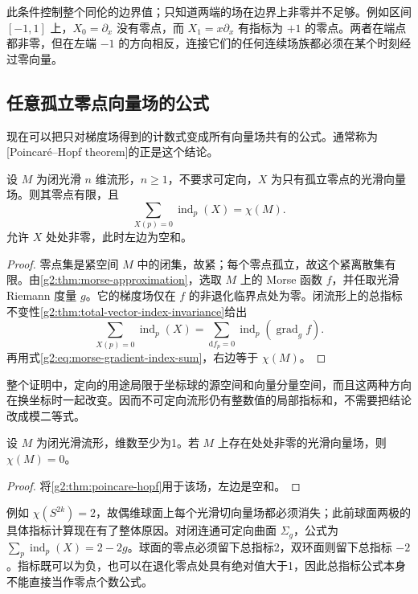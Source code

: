 此条件控制整个同伦的边界值；只知道两端的场在边界上非零并不足够。例如区间 \([-1,1]\) 上，\(X_0=\partial_x\) 没有零点，而 \(X_1=x\partial_x\) 有指标为 \(+1\) 的零点。两者在端点都非零，但在左端 \(-1\) 的方向相反，连接它们的任何连续场族都必须在某个时刻经过零向量。

\subsection{任意孤立零点向量场的公式}
\label{g2:subsec:1704:03}

现在可以把只对梯度场得到的计数式变成所有向量场共有的公式。通常称为[Poincaré--Hopf theorem]的正是这个结论。

\begin{theorem}\label{g2:thm:poincare-hopf}
	设 \(M\) 为闭光滑 \(n\) 维流形，\(n\ge1\)，不要求可定向，\(X\) 为只有孤立零点的光滑向量场。则其零点有限，且
	\begin{equation}\label{g2:eq:poincare-hopf}
		\sum_{X(p)=0}\operatorname{ind}_p(X)=\chi(M).
	\end{equation}
	允许 \(X\) 处处非零，此时左边为空和。
\end{theorem}
\begin{proof}
	零点集是紧空间 \(M\) 中的闭集，故紧；每个零点孤立，故这个紧离散集有限。由\cref{g2:thm:morse-approximation}，选取 \(M\) 上的 Morse 函数 \(f\)，并任取光滑 Riemann 度量 \(g\)。它的梯度场仅在 \(f\) 的非退化临界点处为零。闭流形上的总指标不变性\cref{g2:thm:total-vector-index-invariance}给出
	\[
		\sum_{X(p)=0}\operatorname{ind}_p(X)
		=\sum_{\mathrm df_p=0}\operatorname{ind}_p(\operatorname{grad}_g f).
	\]
	再用式\eqref{g2:eq:morse-gradient-index-sum}，右边等于 \(\chi(M)\)。
\end{proof}

整个证明中，定向的用途局限于坐标球的源空间和向量分量空间，而且这两种方向在换坐标时一起改变。因而不可定向流形仍有整数值的局部指标和，不需要把结论改成模二等式。

\begin{corollary}\label{g2:cor:nonzero-field-euler-obstruction}
	设 \(M\) 为闭光滑流形，维数至少为1。若 \(M\) 上存在处处非零的光滑向量场，则 \(\chi(M)=0\)。
\end{corollary}
\begin{proof}
	将\cref{g2:thm:poincare-hopf}用于该场，左边是空和。
\end{proof}

例如 \(\chi(S^{2k})=2\)，故偶维球面上每个光滑切向量场都必须消失；此前球面两极的具体指标计算现在有了整体原因。对闭连通可定向曲面 \(\Sigma_g\)，公式为 \(\sum_p\operatorname{ind}_p(X)=2-2g\)。球面的零点必须留下总指标2，双环面则留下总指标 \(-2\)。指标既可以为负，也可以在退化零点处具有绝对值大于1，因此总指标公式本身不能直接当作零点个数公式。

